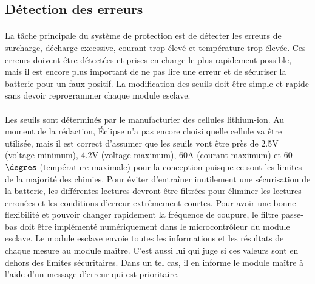 
\subsection{Détection des erreurs}
	\paragraph*{}
	La tâche principale du système de protection est de détecter les erreurs de surcharge, décharge excessive, courant trop élevé et température trop élevée. Ces erreurs doivent être détectées et prises en charge le plus rapidement possible, mais il est encore plus important de ne pas lire une erreur et de sécuriser la batterie pour un faux positif. La modification des seuils doit être simple et rapide sans devoir reprogrammer chaque module esclave.

	\paragraph*{}
	Les seuils sont déterminés par le manufacturier des cellules lithium-ion. Au moment de la rédaction, Éclipse n'a pas encore choisi quelle cellule va être utilisée, mais il est correct d'assumer que les seuils vont être près de 2.5V (voltage minimum), 4.2V (voltage maximum), 60A (courant maximum) et 60 $\degres$ (température maximale) pour la conception puisque ce sont les limites de la majorité des chimies. Pour éviter d'entraîner inutilement une sécurisation de la batterie, les différentes lectures devront être filtrées pour éliminer les lectures erronées et les conditions d'erreur extrêmement courtes. Pour avoir une bonne flexibilité et pouvoir changer rapidement la fréquence de coupure, le filtre passe-bas doit être implémenté numériquement dans le microcontrôleur du module esclave. Le module esclave envoie toutes les informations et les résultats de chaque mesure au module maître. C'est aussi lui qui juge si ces valeurs sont en dehors des limites sécuritaires. Dans un tel cas, il en informe le module maître à l'aide d'un message d'erreur qui est prioritaire.

 \newpage